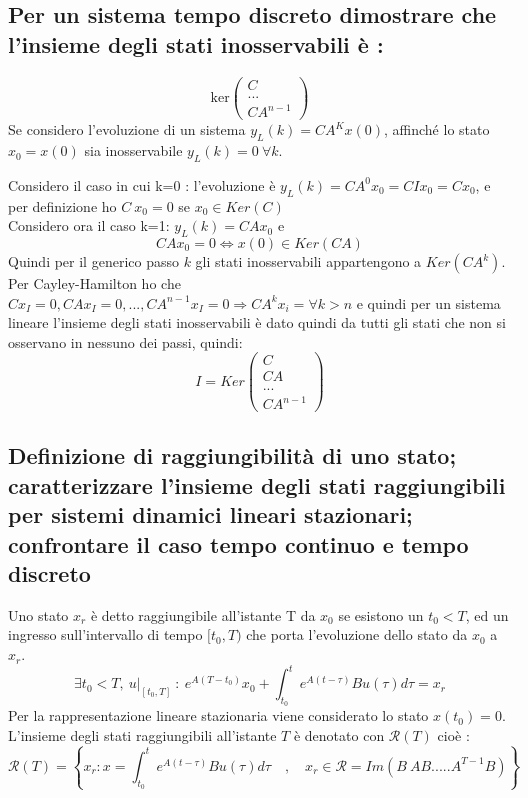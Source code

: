 \documentclass{article}
\begin{document}
\subsection{Per un sistema tempo discreto dimostrare che l'insieme degli stati inosservabili è :}
\[ \text{ker}\begin{pmatrix}C\\...\\CA^{n-1}\end{pmatrix}\]
Se considero l'evoluzione di un sistema $y_L(k)=CA^Kx(0)$, affinché lo stato $x_0 = x(0)$
sia inosservabile $y_L(k)=0\ \forall k$.

Considero il caso in cui k=0 :
l'evoluzione è  $y_L(k)=CA^0x_0=CIx_0=Cx_0$, e per definizione ho $C\ x_0=0$ se $x_0 \in Ker(C)$\\
Considero ora il caso k=1: $y_L(k)=CAx_0$ e 
\[
     CAx_0=0 \Longleftrightarrow x(0) \in Ker(CA)
\]
Quindi per il generico passo $k$ gli stati inosservabili appartengono a $Ker(CA^{k})$.
Per Cayley-Hamilton ho che $Cx_I=0,CAx_I=0,...,CA^{n-1}x_I=0 \Longrightarrow CA^kx_i = \forall k>n$ e quindi 
per un sistema lineare l'insieme degli stati inosservabili è dato quindi da tutti gli stati
che non si osservano in nessuno dei passi, quindi: 
\[
    I=Ker \begin{pmatrix}C\\CA\\...\\CA^{n-1}\end{pmatrix}
\]


\subsection{Definizione di raggiungibilità di uno stato; caratterizzare l'insieme degli stati raggiungibili per sistemi dinamici lineari stazionari; confrontare il caso tempo continuo e tempo discreto}
Uno stato $x_r$ è detto raggiungibile all'istante T da $x_0$ se esistono un $t_0<T$, ed un ingresso sull'intervallo di tempo $[t_0,T)$
che porta l'evoluzione dello stato da $x_0$ a $x_r$.
\[ \exists t_0 < T,\ \left.u\right|_{[t_0,T]}\ :\ e^{A(T-t_0)}x_0+ \int_{t_0}^{t} e^{A(t-\tau)}Bu(\tau) d\tau = x_r \]
Per la rappresentazione lineare stazionaria viene considerato lo stato $x(t_0)=0$. 
L'insieme degli stati raggiungibili all'istante $T$ è denotato con $\mathcal{R}(T)$ cioè :
\[\mathcal{R}(T)=\left\{ x_r : x= \int_{t_0}^{t} e^{A(t-\tau)}Bu(\tau)d\tau
\quad, \quad
x_r \in \mathcal{R}=Im(B\ AB ..... A^{T-1}B) \right\} \]
\end{document}

